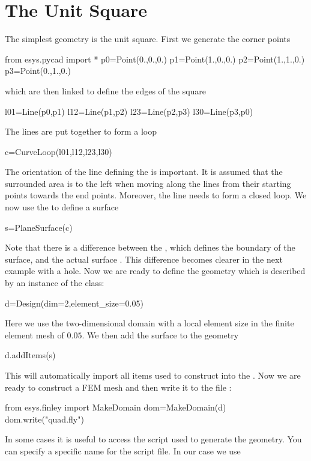 \section{The Unit Square}
The simplest geometry is the unit square. First we generate the corner points
\begin{python}
  from esys.pycad import *
  p0=Point(0.,0.,0.)
  p1=Point(1.,0.,0.)
  p2=Point(1.,1.,0.)
  p3=Point(0.,1.,0.)
\end{python}
which are then linked to define the edges of the square
\begin{python}
  l01=Line(p0,p1)
  l12=Line(p1,p2)
  l23=Line(p2,p3)
  l30=Line(p3,p0)
\end{python}
The lines are put together to form a loop
\begin{python}
  c=CurveLoop(l01,l12,l23,l30)
\end{python}
The orientation of the line defining the  is important.
It is assumed that the surrounded area is to the left when moving along the
lines from their starting points towards the end points.
Moreover, the line needs to form a closed loop.
We now use the  to define a surface
\begin{python}
  s=PlaneSurface(c)
\end{python}
Note that there is a difference between the , which defines
the boundary of the surface, and the actual surface .
This difference becomes clearer in the next example with a hole.
Now we are ready to define the geometry which is described by an instance of
the  class:
\begin{python}
  d=Design(dim=2,element_size=0.05)
\end{python}
Here we use the two-dimensional domain with a local element size in the finite
element mesh of $0.05$.
We then add the surface  to the geometry
\begin{python}
  d.addItems(s)
\end{python}
This will automatically import all items used to construct  into the
 .
Now we are ready to construct a \finley FEM mesh and then write it to the file
:
\begin{python}
  from esys.finley import MakeDomain
  dom=MakeDomain(d)
  dom.write("quad.fly")
\end{python}
In some cases it is useful to access the script used to generate the geometry.
You can specify a specific name for the script file. In our case we use
